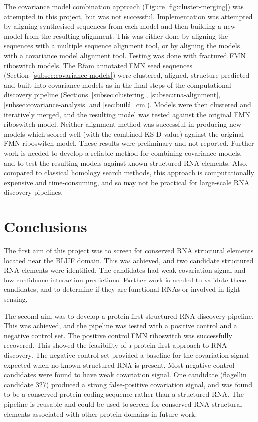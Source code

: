 The covariance model combination approach (Figure \ref{fig:cluster-merging}) was attempted in this project, but was not successful.
Implementation was attempted by aligning synthesised sequences from each model and then building a new model from the resulting alignment.
This was either done by aligning the sequences with a multiple sequence alignment tool, or by aligning the models with a covariance model alignment tool.
Testing was done with fractured \ac{FMN} riboswitch models.
The Rfam annotated \ac{FMN} seed sequences (Section~\ref{subsec:covariance-models}) were clustered, aligned, structure predicted and built into covariance models as in the final steps of the computational discovery pipeline (Sections~\ref{subsec:clustering}, \ref{subsec:rna-alignment}, \ref{subsec:covariance-analysis} and \ref{sec:build_cm}).
Models were then clustered and iteratively merged, and the resulting model was tested against the original \ac{FMN} riboswitch model.
Neither alignment method was successful in producing new models which scored well (with the combined \ac{KS} D value) against the original \ac{FMN} riboswitch model.
These results were preliminary and not reported.
Further work is needed to develop a reliable method for combining covariance models, and to test the resulting models against known structured RNA elements.
Also, compared to classical homology search methods, this approach is computationally expensive and time-consuming, and so may not be practical for large-scale RNA discovery pipelines.

\section{Conclusions}

The first aim of this project was to screen for conserved RNA structural elements located near the \ac{BLUF} domain.
This was achieved, and two candidate structured RNA elements were identified.
The candidates had weak covariation signal and low-confidence interaction predictions.
Further work is needed to validate these candidates, and to determine if they are functional RNAs or involved in light sensing.

The second aim was to develop a protein-first structured RNA discovery pipeline.
This was achieved, and the pipeline was tested with a positive control and a negative control set.
The positive control \ac{FMN} riboswitch was successfully recovered.
This showed the feasibility of a protein-first approach to RNA discovery.
The negative control set provided a baseline for the covariation signal expected when no known structured RNA is present.
Most negative control candidates were found to have weak covariation signal.
One candidate (flagellin candidate 327) produced a strong false-positive covariation signal, and was found to be a conserved protein-coding sequence rather than a structured RNA.
The pipeline is reusable and could be used to screen for conserved RNA structural elements associated with other protein domains in future work.

